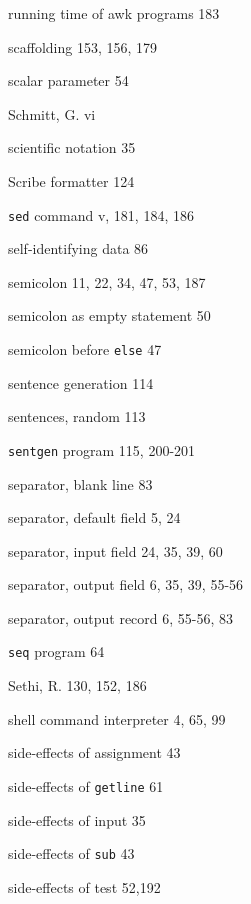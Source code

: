 \begin{multicols}{3}
\hangindent=3pc  running time of awk programs 183

\hangindent=3pc  scaffolding 153, 156, 179

\hangindent=3pc  scalar parameter 54

\hangindent=3pc  Schmitt, G. vi

\hangindent=3pc  scientific notation 35

\hangindent=3pc  Scribe formatter 124

\hangindent=3pc  \verb'sed' command v, 181, 184, 186

\hangindent=3pc  self-identifying data 86

\hangindent=3pc  semicolon 11, 22, 34, 47, 53, 187

\hangindent=3pc  semicolon as empty statement 50

\hangindent=3pc  semicolon before \verb'else' 47

\hangindent=3pc  sentence generation 114

\hangindent=3pc  sentences, random 113

\hangindent=3pc  \verb'sentgen' program 115, 200-201

\hangindent=3pc  separator, blank line 83

\hangindent=3pc  separator, default field 5, 24

\hangindent=3pc  separator, input field 24, 35, 39, 60

\hangindent=3pc  separator, output field 6, 35, 39, 55-56

\hangindent=3pc  separator, output record 6, 55-56,  83

\hangindent=3pc  \verb'seq' program 64

\hangindent=3pc  Sethi, R. 130, 152, 186

\hangindent=3pc  shell command interpreter 4, 65, 99

\hangindent=3pc  side-effects of assignment 43

\hangindent=3pc  side-effects of \verb'getline' 61

\hangindent=3pc  side-effects of input 35

\hangindent=3pc  side-effects of \verb'sub' 43

\hangindent=3pc  side-effects of test 52,192


\end{multicols}
